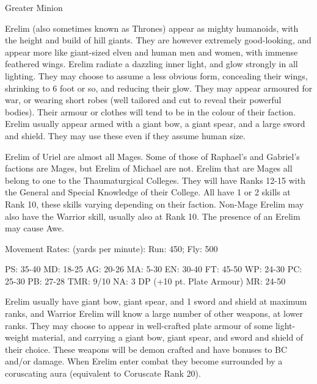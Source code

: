 \begin{Description}

\item[Class] Greater Minion

\item[Description] Erelim (also sometimes known as Thrones) appear as mighty humanoids, with the height and build of hill giants. They are however extremely good-looking, and appear more like giant-sized elven and human men and women, with immense feathered wings. Erelim radiate a dazzling inner light, and glow strongly in all lighting. They may choose to assume a less obvious form, concealing their wings, shrinking to 6 foot or so, and reducing their glow. They may appear armoured for war, or wearing  short robes (well tailored and cut to reveal their powerful bodies). Their armour or clothes will tend to be in the colour of their faction. Erelim usually appear armed with a giant bow, a giant spear, and a large sword and shield. They may use these even if they assume human size.

  \item[Talents, Skills and Magic] Erelim of Uriel are almost all Mages. Some of those of Raphael's and Gabriel's factions are Mages, but Erelim of Michael are not. Erelim that are Mages all belong to one to the Thaumaturgical Colleges. They will have Ranks 12-15 with the General and Special Knowledge of their College. All have 1 or 2 skills at Rank 10, these skills varying depending on their faction. Non-Mage Erelim may also have the Warrior skill, usually also at Rank 10. The presence of an Erelim may cause Awe.

Movement Rates: (yards per minute): Run: 450; Fly: 500

PS: 35-40		MD: 18-25	AG: 20-26	MA: 5-30
EN: 30-40	FT: 45-50	WP: 24-30	PC: 25-30
PB: 27-28	TMR: 9/10	NA: 3 DP (+10 pt. Plate Armour)
MR: 24-50

\item[Weapons] Erelim usually have giant bow, giant spear, and 1 sword
  and shield at maximum ranks, and Warrior Erelim will know a large
  number of other weapons, at lower ranks. They may choose to appear
  in well-crafted plate armour of some light-weight material, and
  carrying a giant bow, giant spear, and sword and shield of their
  choice. These weapons will be demon crafted and have bonuses to BC
  and/or damage. When Erelim enter combat they become surrounded by a
  coruscating aura (equivalent to Coruscate Rank 20).

\end{Description}

